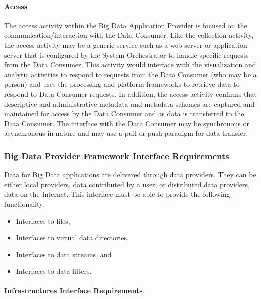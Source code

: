 \documentclass[9pt,]{article}
\providecommand{\tightlist}{%
  \setlength{\itemsep}{0pt}\setlength{\parskip}{0pt}}
\let\oldparagraph\paragraph
\renewcommand{\paragraph}[1]{\oldparagraph{#1}\mbox{}}
\begin{document}
\hypertarget{access}{%
\paragraph{Access}\label{access}}

The access activity within the Big Data Application Provider is focused
on the communication/interaction with the Data Consumer. Like the
collection activity, the access activity may be a generic service such
as a web server or application server that is configured by the System
Orchestrator to handle specific requests from the Data Consumer. This
activity would interface with the visualization and analytic activities
to respond to requests from the Data Consumer (who may be a person) and
uses the processing and platform frameworks to retrieve data to respond
to Data Consumer requests. In addition, the access activity confirms
that descriptive and administrative metadata and metadata schemes are
captured and maintained for access by the Data Consumer and as data is
transferred to the Data Consumer. The interface with the Data Consumer
may be synchronous or asynchronous in nature and may use a pull or push
paradigm for data transfer.

\hypertarget{big-data-provider-framework-interface-requirements}{%
\subsubsection{Big Data Provider Framework Interface
Requirements}\label{big-data-provider-framework-interface-requirements}}

Data for Big Data applications are delivered through data providers.
They can be either local providers, data contributed by a user, or
distributed data providers, data on the Internet. This interface must be
able to provide the following functionality:

\begin{itemize}
\tightlist
\item
  Interfaces to files,
\item
  Interfaces to virtual data directories,
\item
  Interfaces to data streams, and
\item
  Interfaces to data filters.
\end{itemize}

\hypertarget{infrastructures-interface-requirements}{%
\paragraph{Infrastructures Interface
Requirements}\label{infrastructures-interface-requirements}}
\end{document}
